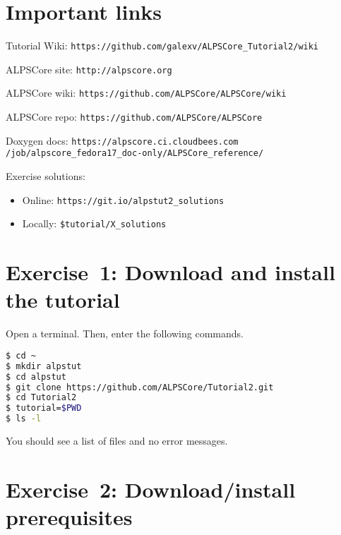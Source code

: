 \documentclass[12pt]{article}
\newcommand{\code}[1]{\texttt{#1}}
\begin{document}
\section*{Important links}
\begin{flushleft}


Tutorial Wiki: \nolinkurl{https://github.com/galexv/ALPSCore_Tutorial2/wiki}



ALPSCore site: \nolinkurl{http://alpscore.org}

ALPSCore wiki: \nolinkurl{https://github.com/ALPSCore/ALPSCore/wiki}

ALPSCore repo: \nolinkurl{https://github.com/ALPSCore/ALPSCore}

Doxygen docs: \nolinkurl{https://alpscore.ci.cloudbees.com}
              \nolinkurl{/job/alpscore_fedora17_doc-only/ALPSCore_reference/}

Exercise solutions:
\begin{itemize}
\item Online: \nolinkurl{https://git.io/alpstut2_solutions}
\item Locally: \code{\color{ballblue}\$tutorial/X\_solutions}
\end{itemize}

\end{flushleft}

\pagebreak

\section*{Exercise~1: Download and install the tutorial}

Open a terminal. Then, enter the following commands.

\begin{lstlisting}[language=sh,emph={ls,cd,mkdir,git}]
$ cd ~
$ mkdir alpstut
$ cd alpstut
$ git clone https://github.com/ALPSCore/Tutorial2.git
$ cd Tutorial2
$ tutorial=$PWD
$ ls -l
\end{lstlisting}

You should see a list of files and no error messages.

\section*{Exercise~2: Download/install prerequisites}
\end{document}
